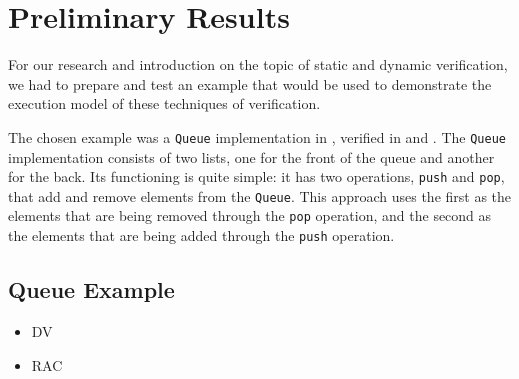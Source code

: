 
%

\chapter{Preliminary Results}
\label{cha:preliminary_results}


For our research and introduction on the topic of static and dynamic verification, 
we had to prepare and test an example that would be used to demonstrate the 
execution model of these techniques of verification. 

The chosen example was a \texttt{Queue} implementation in \ocaml, 
verified in \why and \gospellang. The \texttt{Queue} implementation 
consists of two lists, one for the front of the queue and another for 
the back. Its functioning is quite simple: it has two operations, 
\texttt{push} and \texttt{pop}, that add and remove elements from the \texttt{Queue}. 
This approach uses the first  as the elements that are 
being removed through the \texttt{pop} operation, and the second  
as the elements that are being added through the \texttt{push} operation.

\section{Queue Example}
\label{sec:queue_example}


\begin{itemize}
    \item DV
    \item RAC
\end{itemize}